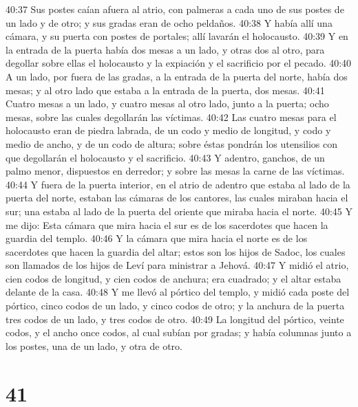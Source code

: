 40:37 Sus postes caían afuera al atrio, con palmeras a cada uno de sus postes de un lado y de otro; y sus gradas eran de ocho peldaños.  
40:38 Y había allí una cámara, y su puerta con postes de portales; allí lavarán el holocausto.  
40:39 Y en la entrada de la puerta había dos mesas a un lado, y otras dos al otro, para degollar sobre ellas el holocausto y la expiación y el sacrificio por el pecado.  
40:40 A un lado, por fuera de las gradas, a la entrada de la puerta del norte, había dos mesas; y al otro lado que estaba a la entrada de la puerta, dos mesas.  
40:41 Cuatro mesas a un lado, y cuatro mesas al otro lado, junto a la puerta; ocho mesas, sobre las cuales degollarán las víctimas.  
40:42 Las cuatro mesas para el holocausto eran de piedra labrada, de un codo   y medio de longitud, y codo y medio de ancho, y de un codo de altura; sobre éstas pondrán los utensilios con que degollarán el holocausto y el sacrificio. 
40:43 Y adentro, ganchos, de un palmo menor,  dispuestos en derredor; y sobre las mesas la carne de las víctimas.  
40:44 Y fuera de la puerta interior, en el atrio de adentro que estaba al lado de la puerta del norte, estaban las cámaras de los cantores, las cuales miraban hacia el sur; una estaba al lado de la puerta del oriente que miraba hacia el norte.  
40:45 Y me dijo: Esta cámara que mira hacia el sur es de los sacerdotes que hacen la guardia del templo.  
40:46 Y la cámara que mira hacia el norte es de los sacerdotes que hacen la guardia del altar; estos son los hijos de Sadoc, los cuales son llamados de los hijos de Leví para ministrar a Jehová.  
40:47 Y midió el atrio, cien codos   de longitud, y cien codos de anchura; era cuadrado; y el altar estaba delante de la casa.  
40:48 Y me llevó al pórtico del templo, y midió cada poste del pórtico, cinco codos   de un lado, y cinco codos de otro; y la anchura de la puerta tres codos de un lado, y tres codos de otro.  
40:49 La longitud del pórtico, veinte codos,  y el ancho once codos, al cual subían por gradas; y había columnas junto a los postes, una de un lado, y otra de otro.  

\chapter{41}

